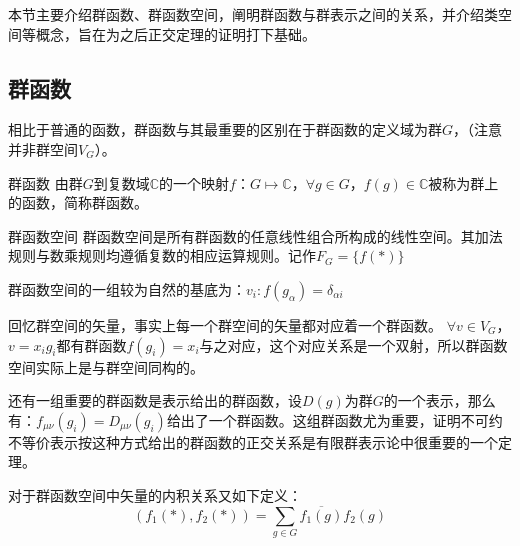 
\begin{issues}
\issueDraft
\issueTODO
\end{issues}

本节主要介绍群函数、群函数空间，阐明群函数与群表示之间的关系，并介绍类空间等概念，旨在为之后正交定理的证明打下基础。

\subsection{群函数}

相比于普通的函数，群函数与其最重要的区别在于群函数的定义域为群$G$，（注意并非群空间$V_G$）。
\begin{definition}{群函数}
由群$G$到复数域$\mathbb{C}$的一个映射$f$：$G\longmapsto \mathbb{C}$，$\forall g\in G$，$f(g)\in \mathbb{C}$被称为群上的函数，简称群函数。
\end{definition}

\begin{definition}{群函数空间}
群函数空间是所有群函数的任意线性组合所构成的线性空间。其加法规则与数乘规则均遵循复数的相应运算规则。记作$F_G=\{f(*)\}$
\end{definition}

群函数空间的一组较为自然的基底为：$v_i:f(g_\alpha)=\delta_{\alpha i}$

回忆群空间的矢量，事实上每一个群空间的矢量都对应着一个群函数。
$\forall v\in V_G$，$v=x_ig_i$都有群函数$f(g_i)=x_i$与之对应，这个对应关系是一个双射，所以群函数空间实际上是与群空间同构的。

还有一组重要的群函数是表示给出的群函数，设$D(g)$为群$G$的一个表示，那么有：$f_{\mu\nu}(g_i)=D_{\mu\nu}(g_i)$给出了一个群函数。这组群函数尤为重要，证明不可约不等价表示按这种方式给出的群函数的正交关系是有限群表示论中很重要的一个定理。

对于群函数空间中矢量的内积关系又如下定义：
$$(f_1(*),f_2(*))=\displaystyle\sum_{g\in G} \overline{f_1(g)}f_2(g)$$